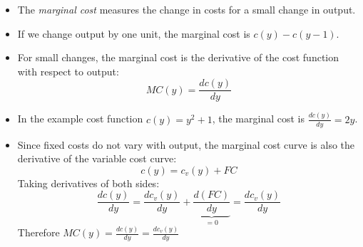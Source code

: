 \documentclass{article}
\begin{document}
\begin{center}
\end{center}

\begin{itemize}
  \item The \emph{marginal cost} measures the change in costs for a small change in output.
  \item If we change output by one unit, the marginal cost is $c\left( y \right)-c\left( y-1 \right)$.
  \item For small changes, the marginal cost is the derivative of the cost function with respect to output: \[MC\left( y \right)=\frac{dc\left( y \right)}{dy}\]
  \item In the example cost function $c\left( y \right)=y^2+1$, the marginal cost is $\frac{dc\left( y \right)}{dy}=2y$.
  \item Since fixed costs do not vary with output, the marginal cost curve is also the derivative of the variable cost curve:
    \begin{equation*}
      c\left( y \right)=c_v\left( y \right)+FC
    \end{equation*}
    Taking derivatives of both sides:
    \begin{equation*}
      \frac{dc\left( y \right)}{dy} =\frac{dc_v\left( y \right)}{dy} +\underbrace{\frac{d\left( FC \right)}{dy}}_{=0} = \frac{dc_v\left( y \right)}{dy}
    \end{equation*}
    Therefore $MC\left( y \right)=\frac{dc\left( y \right)}{dy}=\frac{dc_v\left( y \right)}{dy}$
\end{itemize}
\end{document}

